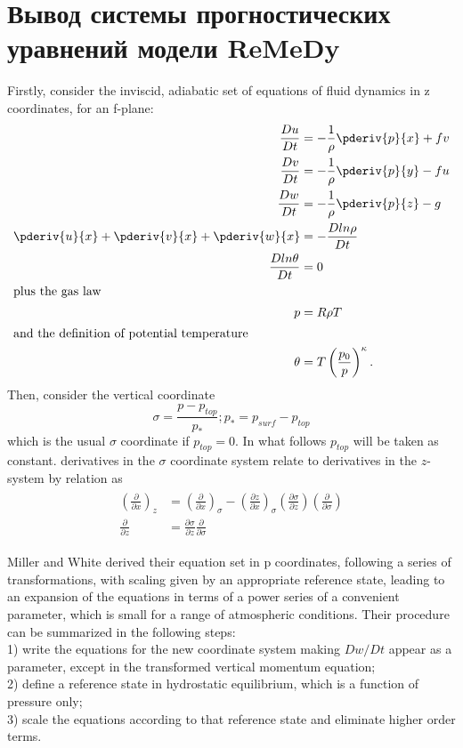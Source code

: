 \appendix
\chapter{Вывод системы прогностических уравнений модели ReMeDy}
\label{app:A}

Firstly, consider the inviscid, adiabatic set of equations of fluid dynamics in z coordinates, for an f-plane:
\begin{subequations}\label{eqn:0}
\begin{align}
\frac{Du}{Dt}&=-\frac{1}{\rho}\pderiv{p}{x}+fv \label{eqn:1}\\
\frac{Dv}{Dt}&=-\frac{1}{\rho}\pderiv{p}{y}-fu \label{eqn:2}\\
\frac{Dw}{Dt}&=-\frac{1}{\rho}\pderiv{p}{z}-g \label{eqn:3}\\
\pderiv{u}{x}+\pderiv{v}{x}+\pderiv{w}{x}&=-\frac{Dln\rho}{Dt} \label{eqn:4}\\
\frac{Dln\theta}{Dt}&=0 \\
\intertext{plus the gas law}
p&=R\rho T \label{eqn:5}\\
\intertext{and the definition of potential temperature}
\theta&=T\left(\frac{p_0}{p}\right)^\kappa. \label{eqn:6}
\end{align}
\end{subequations}
Then, consider the vertical coordinate
\begin{equation}
\sigma=\frac{p-p_{top}}{p_*}; p_*=p_{surf}-p_{top}
\end{equation}
which is the usual $\sigma$ coordinate if $p_{top}=0$. In what follows $p_{top}$ will be taken as constant. derivatives in the $\sigma$ coordinate system relate to derivatives in the $z$-system by relation as
\begin{align}
\begin{split}
\left(\frac{\partial}{\partial x}\right)_z&=\left(\frac{\partial}{\partial x}\right)_{\sigma}-\left(\frac{\partial z}{\partial x}\right)_{\sigma} \left(\frac{\partial \sigma}{\partial z}\right) \left(\frac{\partial}{\partial \sigma}\right) \\
\frac{\partial}{\partial z}&=\frac{\partial\sigma}{\partial z}\frac{\partial}{\partial \sigma}
\end{split} \label{z2sigma:1}
\end{align}

Miller and White derived their equation set in p coordinates, following a series of transformations, with scaling given by an appropriate reference state, leading to an expansion of the equations in terms of a power series of a convenient parameter, which is small for a range of atmospheric conditions.
Their procedure can be summarized in the following steps: \\
1) write the equations for the new coordinate system making $Dw/Dt$ appear as a parameter, except in the transformed vertical momentum equation; \\
2) define a reference state in hydrostatic equilibrium, which is a function of pressure only; \\
3) scale the equations according to that reference state and eliminate higher order terms.

